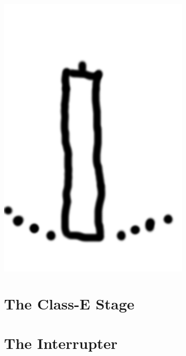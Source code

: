 \begin{marginfigure}
\includegraphics[width=0.7\textwidth]{simon/resources/teslaCoilSketch.png}
\end{marginfigure}



\section{The Class-E Stage}

\section{The Interrupter}